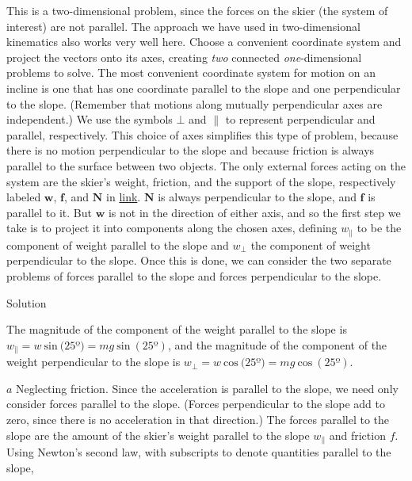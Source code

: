 \documentclass[
]{book}
\begin{document}
This is a two-dimensional problem, since the forces on the skier (the
system of interest) are not parallel. The approach we have used in
two-dimensional kinematics also works very well here. Choose a
convenient coordinate system and project the vectors onto its axes,
creating \emph{two} connected \emph{one}-dimensional problems to solve. The most
convenient coordinate system for motion on an incline is one that has
one coordinate parallel to the slope and one perpendicular to the slope.
(Remember that motions along mutually perpendicular axes are
independent.) We use the symbols \(\bot{}\) and \(\parallel {}\) to
represent perpendicular and parallel, respectively. This choice of axes
simplifies this type of problem, because there is no motion
perpendicular to the slope and because friction is always parallel to
the surface between two objects. The only external forces acting on the
system are the skier's weight, friction, and the support of the slope,
respectively labeled \(\textbf{w}{}\), \(\textbf{f}{}\), and \(\textbf{N}{}\)
in \protect\hyperlink{import-auto-id2149297}{link}.
\(\textbf{N}{}\)\textbf{} is always perpendicular
to the slope, and \(\textbf{f}{}\)\textbf{} is
parallel to it. But \(\textbf{w}{}\) is not in the direction of either
axis, and so the first step we take is to project it into components
along the chosen axes, defining \(w_{\parallel}\) to be the component of
weight parallel to the slope and \(w_{\bot}{}\) the component of weight
perpendicular to the slope. Once this is done, we can consider the two
separate problems of forces parallel to the slope and forces
perpendicular to the slope.

{Solution}

The magnitude of the component of the weight parallel to the slope is
\({{w_{\parallel} = \mathit{w}\ }\text{sin}\ (\text{25º}{) = {\mathit{mg}\ }}\text{sin}\ (\text{25º})}{}\),
and the magnitude of the component of the weight perpendicular to the
slope is
\({{w_{\bot} = \mathit{w}\ }\text{cos}\ (\text{25º}{) = {\mathit{mg}\ }}\text{cos}\ (\text{25º})}{}\).

\(a\) Neglecting friction. Since the acceleration is parallel to the
slope, we need only consider forces parallel to the slope. (Forces
perpendicular to the slope add to zero, since there is no acceleration
in that direction.) The forces parallel to the slope are the amount of
the skier's weight parallel to the slope \(w_{\parallel}{}\) and friction
\(f{}\). Using Newton's second law, with subscripts to denote quantities
parallel to the slope,
\end{document}
